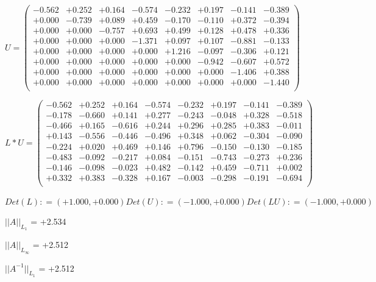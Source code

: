 \documentclass[9pt]{article}
\theoremstyle{plain}
\theoremstyle{definition}
\theoremstyle{remark}
\numberwithin{equation}{section}
\begin{document}
$U = \left(
\begin{array}{
cccccccc}
-0.562 & +0.252 & +0.164 & -0.574 & -0.232 & +0.197 & -0.141 & -0.389 \\
+0.000 & -0.739 & +0.089 & +0.459 & -0.170 & -0.110 & +0.372 & -0.394 \\
+0.000 & +0.000 & -0.757 & +0.693 & +0.499 & +0.128 & +0.478 & +0.336 \\
+0.000 & +0.000 & +0.000 & -1.371 & +0.097 & +0.107 & -0.881 & -0.133 \\
+0.000 & +0.000 & +0.000 & +0.000 & +1.216 & -0.097 & -0.306 & +0.121 \\
+0.000 & +0.000 & +0.000 & +0.000 & +0.000 & -0.942 & -0.607 & +0.572 \\
+0.000 & +0.000 & +0.000 & +0.000 & +0.000 & +0.000 & -1.406 & +0.388 \\
+0.000 & +0.000 & +0.000 & +0.000 & +0.000 & +0.000 & +0.000 & -1.440 \\
\end{array}
\right)$ \newline 

$L * U  = \left(
\begin{array}{
cccccccc}
-0.562 & +0.252 & +0.164 & -0.574 & -0.232 & +0.197 & -0.141 & -0.389 \\
-0.178 & -0.660 & +0.141 & +0.277 & -0.243 & -0.048 & +0.328 & -0.518 \\
-0.466 & +0.165 & -0.616 & +0.244 & +0.296 & +0.285 & +0.383 & -0.011 \\
+0.143 & -0.556 & -0.446 & -0.496 & +0.348 & +0.062 & -0.304 & -0.090 \\
-0.224 & +0.020 & +0.469 & +0.146 & +0.796 & -0.150 & -0.130 & -0.185 \\
-0.483 & -0.092 & -0.217 & +0.084 & -0.151 & -0.743 & -0.273 & +0.236 \\
-0.146 & -0.098 & -0.023 & +0.482 & -0.142 & +0.459 & -0.711 & +0.002 \\
+0.332 & +0.383 & -0.328 & +0.167 & -0.003 & -0.298 & -0.191 & -0.694 \\
\end{array}
\right)$ \newline 

$Det(L) :    = (+1.000,+0.000)     Det(U) :    = (-1.000,+0.000)     Det(LU) :    = (-1.000,+0.000)$

$||A||_{L_1}$  = +2.534

$||A||_{L_{\infty}}$ = +2.512

$||A^{-1}||_{L_1}$  = +2.512
\end{document}
